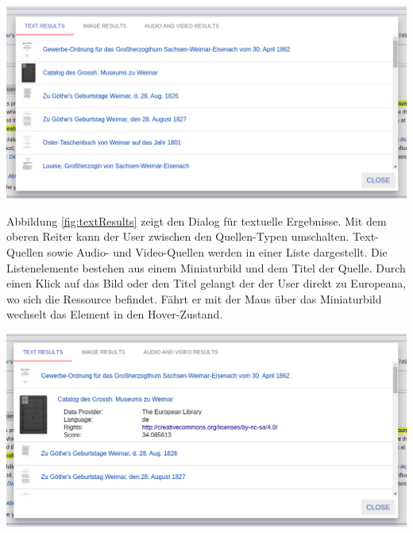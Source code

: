  \begin{minipage}{\linewidth}
	\centering
	\vspace*{0.5cm}
	\includegraphics[width=\linewidth]{Bilder/app-screenshots/text-results.png}
	\label{fig:textResults}
	\vspace*{0.5cm}
 \end{minipage}

 Abbildung \ref{fig:textResults} zeigt den Dialog für textuelle Ergebnisse. Mit dem oberen Reiter kann der User zwischen den Quellen-Typen umschalten. Text-Quellen sowie Audio- und Video-Quellen werden in einer Liste dargestellt. Die Listenelemente bestehen aus einem Miniaturbild und dem Titel der Quelle. Durch einen Klick auf das Bild oder den Titel gelangt der der User direkt zu Europeana, wo sich die Ressource befindet. Fährt er mit der Maus über das Miniaturbild wechselt das Element in den Hover-Zustand. 

 \begin{minipage}{\linewidth}
	\centering
	\vspace*{0.5cm}
	\includegraphics[width=\linewidth]{Bilder/app-screenshots/text-results-hovered.png}
	\label{fig:textResultsHover}
	\vspace*{0.5cm}
 \end{minipage}

